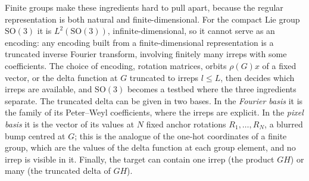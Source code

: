 \documentclass[a4paper,11pt]{article}
\theoremstyle{remark}
\theoremstyle{definition}
\newcommand{\SO}{\mathrm{SO}(3)}
\begin{document}
Finite groups make these ingredients hard to pull apart, because the regular
representation is both natural and finite-dimensional. For the compact Lie group
$\SO$ it is $L^2(\SO)$, infinite-dimensional, so it cannot serve as an encoding:
any encoding built from a finite-dimensional representation is a truncated inverse
Fourier transform, involving finitely many irreps with some coefficients. The
choice of encoding, rotation matrices, orbits $\rho(G)x$ of a fixed vector, or the
delta function at $G$ truncated to irreps $l\le L$, then decides which irreps are
available, and $\SO$ becomes a testbed where the three ingredients separate. The truncated delta can be
given in two bases. In the \emph{Fourier basis} it is the family of its Peter--Weyl
coefficients, where the irreps are explicit. In the \emph{pixel basis} it is the
vector of its values at $N$ fixed anchor rotations $R_1,\dots,R_N$, a blurred bump
centred at $G$; this is the analogue of the one-hot coordinates of a finite group,
which are the values of the delta function at each group element, and no irrep is
visible in it. Finally, the target can contain one irrep (the product $GH$) or many
(the truncated delta of $GH$).
\end{document}
